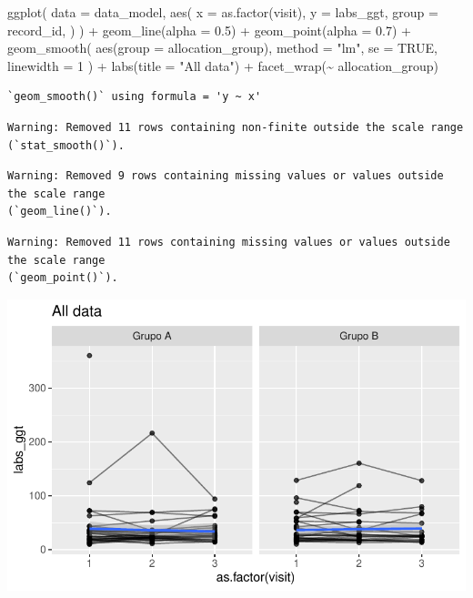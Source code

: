 \documentclass[
  letterpaper,
  DIV=11,
  numbers=noendperiod]{scrartcl}
\newenvironment{Shaded}{\begin{snugshade}}{\end{snugshade}}
\newcommand{\AttributeTok}[1]{\textcolor[rgb]{0.40,0.45,0.13}{#1}}
\newcommand{\ConstantTok}[1]{\textcolor[rgb]{0.56,0.35,0.01}{#1}}
\newcommand{\DecValTok}[1]{\textcolor[rgb]{0.68,0.00,0.00}{#1}}
\newcommand{\FloatTok}[1]{\textcolor[rgb]{0.68,0.00,0.00}{#1}}
\newcommand{\FunctionTok}[1]{\textcolor[rgb]{0.28,0.35,0.67}{#1}}
\newcommand{\NormalTok}[1]{\textcolor[rgb]{0.00,0.23,0.31}{#1}}
\newcommand{\SpecialCharTok}[1]{\textcolor[rgb]{0.37,0.37,0.37}{#1}}
\newcommand{\StringTok}[1]{\textcolor[rgb]{0.13,0.47,0.30}{#1}}
\begin{document}
\begin{Shaded}
\begin{Highlighting}[]
\FunctionTok{ggplot}\NormalTok{(}
    \AttributeTok{data =}\NormalTok{ data\_model, }
    \FunctionTok{aes}\NormalTok{(}
        \AttributeTok{x =} \FunctionTok{as.factor}\NormalTok{(visit),}
        \AttributeTok{y =}\NormalTok{ labs\_ggt,}
        \AttributeTok{group =}\NormalTok{ record\_id,}
\NormalTok{    )}
\NormalTok{) }\SpecialCharTok{+}
    \FunctionTok{geom\_line}\NormalTok{(}\AttributeTok{alpha =} \FloatTok{0.5}\NormalTok{) }\SpecialCharTok{+}
    \FunctionTok{geom\_point}\NormalTok{(}\AttributeTok{alpha =} \FloatTok{0.7}\NormalTok{) }\SpecialCharTok{+}
    \FunctionTok{geom\_smooth}\NormalTok{(}
        \FunctionTok{aes}\NormalTok{(}\AttributeTok{group =}\NormalTok{ allocation\_group),}
        \AttributeTok{method =} \StringTok{"lm"}\NormalTok{,}
        \AttributeTok{se =} \ConstantTok{TRUE}\NormalTok{,}
        \AttributeTok{linewidth =} \DecValTok{1}
\NormalTok{    ) }\SpecialCharTok{+}
    \FunctionTok{labs}\NormalTok{(}\AttributeTok{title =} \StringTok{"All data"}\NormalTok{) }\SpecialCharTok{+}
    \FunctionTok{facet\_wrap}\NormalTok{(}\SpecialCharTok{\textasciitilde{}}\NormalTok{ allocation\_group) }
\end{Highlighting}
\end{Shaded}

\begin{verbatim}
`geom_smooth()` using formula = 'y ~ x'
\end{verbatim}

\begin{verbatim}
Warning: Removed 11 rows containing non-finite outside the scale range
(`stat_smooth()`).
\end{verbatim}

\begin{verbatim}
Warning: Removed 9 rows containing missing values or values outside the scale range
(`geom_line()`).
\end{verbatim}

\begin{verbatim}
Warning: Removed 11 rows containing missing values or values outside the scale range
(`geom_point()`).
\end{verbatim}

\includegraphics{Outcomes_V1V2V3_files/figure-pdf/labs_ggt_6-1.pdf}
\end{document}
